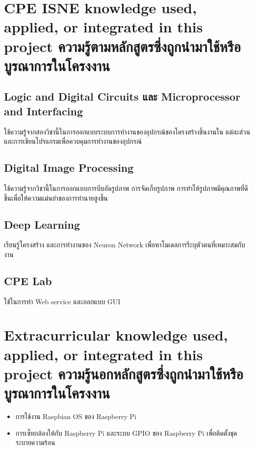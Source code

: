 \section{\ifenglish%
\ifcpe CPE \else ISNE \fi knowledge used, applied, or integrated in this project
\else%
ความรู้ตามหลักสูตรซึ่งถูกนำมาใช้หรือบูรณาการในโครงงาน
\fi
}

\subsection{Logic and Digital Circuits และ Microprocessor and Interfacing}

ใช้ความรู้จากสองวิชานี้ในการออกแบบระบบการทำงานของอุปกรณ์ของโครงสร้างชิ้นงานใน
แต่ละส่วน และการเขียนโปรแกรมเพื่อควบคุมการทำงานของอุปกรณ์

\subsection{Digital Image Processing}

ใช้ความรู้จากวิชานี้ในการออกแบบการบีบอัดรูปภาพ การจัดเก็บรูปภาพ การทำให้รูปภาพมีคุณภาพที่ดีขึ้นเพื่อให้ความแม่นยำของการทำนายสูงขึ้น

\subsection{Deep Learning}
เรียนรู้โครงสร้าง และการทำงานของ Neuron Network เพื่อหาโมเดลการรีะบุตัวตนที่เหมาะสมกับงาน

\subsection{CPE Lab}
ใช้ในการทำ Web service และออกแบบ GUI

\section{\ifenglish%
Extracurricular knowledge used, applied, or integrated in this project
\else%
ความรู้นอกหลักสูตรซึ่งถูกนำมาใช้หรือบูรณาการในโครงงาน
\fi
}
\begin{itemize}
  \item การใช้งาน Raspbian OS ของ Raspberry Pi
  \item การเซ็ทกล้องให้กับ Raspberry Pi และระบบ GPIO ของ Raspberry Pi เพื่อติดตั้งชุดระบายความร้อน
\end{itemize}



